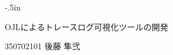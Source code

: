 \documentclass[a4paper,12pt]{jreport}
\begin{document}








\clearpage
\thispagestyle{empty}
\oddsidemargin -4in
\evensidemargin -4in
\topmargin -.5in
{
\tate
\Large\sffamily\gtfamily
\begin{minipage}{9.5in}
\begin{minipage}{6.0in}
OJLによるトレースログ可視化ツールの開発
\end{minipage}
\hfill\hfill\hfill\hfill
350702101
\hfill
後藤 隼弐
\end{minipage}
}
\end{document}
